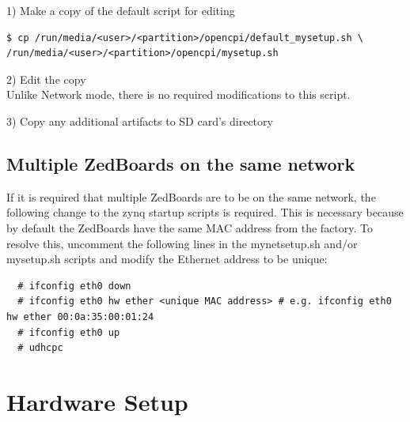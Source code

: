 \begin{flushleft}
1) Make a copy of the default script for editing\medskip
\begin{verbatim}
$ cp /run/media/<user>/<partition>/opencpi/default_mysetup.sh \
/run/media/<user>/<partition>/opencpi/mysetup.sh
\end{verbatim}\medskip

2) Edit the copy\\ \medskip
Unlike Network mode, there is no required modifications to this script. \medskip

3) Copy any additional artifacts to SD card's  directory \medskip


\end{flushleft}

\subsection{Multiple ZedBoards on the same network}
\label{sec:Multiple ZedBoards on the same network}
If it is required that multiple ZedBoards are to be on the same network, the following change to the zynq startup scripts is required. This is necessary because by default the ZedBoards have the same MAC address from the factory. To resolve this, uncomment the following lines in the mynetsetup.sh and/or mysetup.sh scripts and modify the Ethernet address to be unique:
\begin{verbatim}
  # ifconfig eth0 down
  # ifconfig eth0 hw ether <unique MAC address> # e.g. ifconfig eth0 hw ether 00:0a:35:00:01:24
  # ifconfig eth0 up
  # udhcpc
\end{verbatim}

\pagebreak
\section{Hardware Setup}

